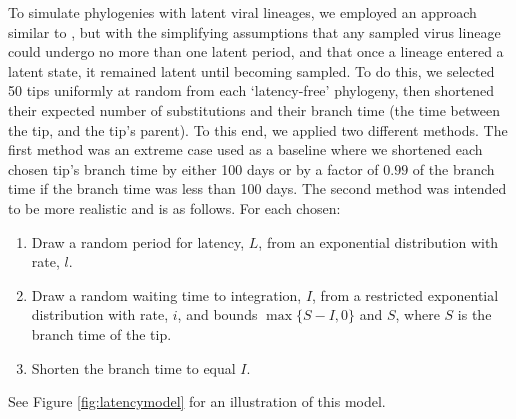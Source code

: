 \documentclass[12pt]{article}
\begin{document}

To simulate phylogenies with latent viral lineages, we employed an approach similar to \citet{Immonen14}, but with the simplifying assumptions that any sampled virus lineage could undergo no more than one latent period, and that once a lineage entered a latent state, it remained latent until becoming sampled.
To do this, we selected 50 tips uniformly at random from each `latency-free' phylogeny, then shortened their expected number of substitutions and their branch time (the time between the tip, and the tip's parent).
To this end, we applied two different methods.
The first method was an extreme case used as a baseline where we shortened each chosen tip's branch time by either 100 days or by a factor of $0.99$ of the branch time if the branch time was less than 100 days.
The second method was intended to be more realistic and is as follows. For each chosen:
\begin{enumerate}
\item Draw a random period for latency, $L$, from an exponential distribution with rate, $l$.
\item Draw a random waiting time to integration, $I$, from a restricted exponential distribution with rate, $i$, and bounds $\max\{S-I, 0\}$ and $S$, where $S$ is the branch time of the tip.
\item Shorten the branch time to equal $I$.
\end{enumerate}
See Figure \ref{fig:latencymodel} for an illustration of this model.
\end{document}
